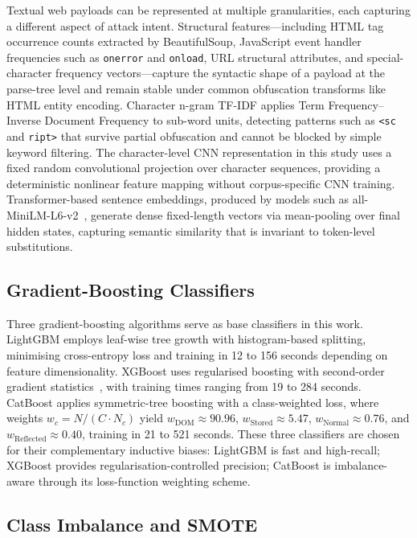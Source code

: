 \documentclass[11pt,a4paper]{article}
\begin{document}
Textual web payloads can be represented at multiple granularities, each capturing a different aspect
of attack intent. Structural features---including HTML tag occurrence counts extracted by BeautifulSoup,
JavaScript event handler frequencies such as \texttt{onerror} and \texttt{onload}, URL structural
attributes, and special-character frequency vectors---capture the syntactic shape of a payload at the
parse-tree level and remain stable under common obfuscation transforms like HTML entity encoding.
Character n-gram TF-IDF applies Term Frequency--Inverse Document Frequency to sub-word units,
detecting patterns such as \texttt{<sc} and \texttt{ript>} that survive partial obfuscation and cannot
be blocked by simple keyword filtering. The character-level CNN representation in this study uses a fixed random convolutional projection over character sequences, providing a deterministic nonlinear feature mapping without corpus-specific CNN training. Transformer-based sentence embeddings, produced by models such as
all-MiniLM-L6-v2~\cite{minilm2020}, generate dense fixed-length vectors via mean-pooling over final
hidden states, capturing semantic similarity that is invariant to token-level substitutions.

\subsection{Gradient-Boosting Classifiers}

Three gradient-boosting algorithms serve as base classifiers in this work. LightGBM employs
leaf-wise tree growth with histogram-based splitting, minimising cross-entropy loss and training in
12 to 156 seconds depending on feature dimensionality. XGBoost uses regularised boosting with
second-order gradient statistics~\cite{xgboost2016}, with training times ranging from 19 to 284
seconds. CatBoost applies symmetric-tree boosting with a class-weighted loss, where weights
$w_c = N/(C \cdot N_c)$ yield $w_{\text{DOM}} \approx 90.96$, $w_{\text{Stored}} \approx 5.47$,
$w_{\text{Normal}} \approx 0.76$, and $w_{\text{Reflected}} \approx 0.40$, training in 21 to 521
seconds. These three classifiers are chosen for their complementary inductive biases: LightGBM is
fast and high-recall; XGBoost provides regularisation-controlled precision; CatBoost is
imbalance-aware through its loss-function weighting scheme.

\subsection{Class Imbalance and SMOTE}
\end{document}

